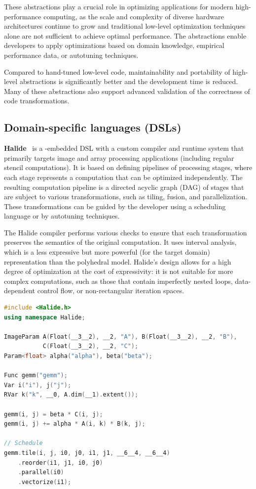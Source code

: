 These abstractions play a crucial role in optimizing applications for modern high-performance computing, as the scale and complexity of diverse hardware architectures continue to grow and traditional low-level optimization techniques alone are not sufficient to achieve optimal performance. The abstractions enable developers to apply optimizations based on domain knowledge, empirical performance data, or autotuning techniques.

Compared to hand-tuned low-level code, maintainability and portability of high-level abstractions is significantly better and the development time is reduced. Many of these abstractions also support advanced validation of the correctness of code transformations.


\subsection{Domain-specific languages (DSLs)}\label{sec:dsls}

\textbf{Halide}~\cite{ragan2013halide} is a \cpp-embedded DSL with a custom compiler and runtime system that primarily targets image and array processing applications (including regular stencil computations). It is based on defining pipelines of processing stages, where each stage represents a computation that can be optimized independently. The resulting computation pipeline is a directed acyclic graph (DAG) of stages that are subject to various transformations, such as tiling, fusion, and parallelization. These transformations can be guided by the developer using a scheduling language or by autotuning techniques.

The Halide compiler performs various checks to ensure that each transformation preserves the semantics of the original computation. It uses interval analysis, which is a less expressive but more powerful (for the target domain) representation than the polyhedral model. Halide's design allows for a high degree of optimization at the cost of expressivity: it is not suitable for more complex computations, such as those that contain imperfectly nested loops, data-dependent control flow, or non-rectangular iteration spaces.

\begin{lstlisting}[language=C++, morekeywords={Param, ImageParam, Var, RVar, Func, Float}]
#include <Halide.h>
using namespace Halide;

ImageParam A(Float(__3__2), __2, "A"), B(Float(__3__2), __2, "B"),
           C(Float(__3__2), __2, "C");
Param<float> alpha("alpha"), beta("beta");

Func gemm("gemm");
Var i("i"), j("j");
RVar k("k", __0, A.dim(__1).extent());

gemm(i, j) = beta * C(i, j);
gemm(i, j) += alpha * A(i, k) * B(k, j);

// Schedule
gemm.tile(i, j, i0, j0, i1, j1, __6__4, __6__4)
    .reorder(i1, j1, i0, j0)
    .parallel(i0)
    .vectorize(i1);
\end{lstlisting}


